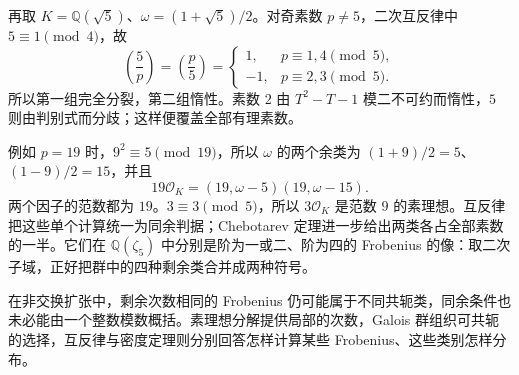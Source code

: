 \begin{example}\label{b3:exm:quadratic-five-reciprocity}
	再取 \(K=\mathbb Q(\sqrt5)\)、\(\omega=(1+\sqrt5)/2\)。对奇素数 \(p\ne5\)，二次互反律中 \(5\equiv1\pmod4\)，故
	\[
		\left(\dfrac5p\right)=\left(\dfrac p5\right)=
		\begin{cases}
			1,&p\equiv1,4\pmod5,\\
			-1,&p\equiv2,3\pmod5.
		\end{cases}
	\]
	所以第一组完全分裂，第二组惰性。素数 \(2\) 由 \(T^2-T-1\) 模二不可约而惰性，\(5\) 则由判别式而分歧；这样便覆盖全部有理素数。

	\ProseParagraphBreak
	例如 \(p=19\) 时，\(9^2\equiv5\pmod{19}\)，所以 \(\omega\) 的两个余类为 \((1+9)/2=5\)、\((1-9)/2=15\)，并且
	\[
		19\mathcal O_K=(19,\omega-5)(19,\omega-15).
	\]
	两个因子的范数都为 \(19\)。\(3\equiv3\pmod5\)，所以 \(3\mathcal O_K\) 是范数 \(9\) 的素理想。互反律把这些单个计算统一为同余判据；Chebotarev 定理进一步给出两类各占全部素数的一半。它们在 \(\mathbb Q(\zeta_5)\) 中分别是阶为一或二、阶为四的 Frobenius 的像：取二次子域，正好把群中的四种剩余类合并成两种符号。
\end{example}

在非交换扩张中，剩余次数相同的 Frobenius 仍可能属于不同共轭类，同余条件也未必能由一个整数模数概括。素理想分解提供局部的次数，Galois 群组织可共轭的选择，互反律与密度定理则分别回答怎样计算某些 Frobenius、这些类别怎样分布。
